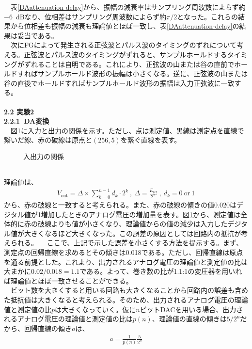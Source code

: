 \documentclass[a4paper,10.5pt]{ltjsarticle}
\begin{document}
　表\ref{DAattenuation-delay}から、振幅の減衰率はサンプリング周波数によらず約$-6$\ dBなり、位相差はサンプリング周波数によらず約$\pi/2$となった。これらの結果から位相差も振幅の減衰も理論値とほぼ一致し、表\ref{DAattenuation-delay}の結果は妥当である。\\
　次にFGによって発生される正弦波とパルス波のタイミングのずれについて考える。正弦波とパルス波のタイミングがずれると、サンプルホールドするタイミングがずれることは自明である。これにより、正弦波の山または谷の直前でホールドすればサンプルホールド波形の振幅は小さくなる。逆に、正弦波の山または谷の直後でホールドすればサンプルホールド波形の振幅は入力正弦波に一致する。\\
\\
{\large \bfseries 2.2 実験2}\\
{\large \bfseries 2.2.1\ DA変換}\\
　図\ref{DA}に入力と出力の関係を示す。ただし、点は測定値、黒線は測定点を直線で繋いだ線、赤の破線は原点と$(256,5)$を繋ぐ直線を表す。\\
\begin{figure}[h]
  \centering
  
  \vspace{-30pt}\caption{入出力の関係}
  \label{DA}
\end{figure}\\
理論値は、
\begin{align}
  V_\mathrm{out}=\Delta\times\sum^{n-1}_{k=0}{d_k\cdot 2^k}\ ,\ \Delta=\frac{E_\mathrm{ref}}{2^n}\ ,\ d_k=0\ \mathrm{or}\ 1
\end{align}
から、赤の破線と一致すると考えられる。また、赤の破線の傾きの値$0.020$はデジタル値が1増加したときのアナログ電圧の増加量を表す。図\ref{DA}から、測定値は全体的に赤の破線よりも値が小さくなり、理論値からの値の減少は入力したデジタル値が大きくなるほど大きくなった。この誤差の原因としては回路内の抵抗が考えられる。
　ここで、上記で示した誤差を小さくする方法を提示する。まず、測定点の回帰直線を求めるとその傾きは0.018である。ただし、回帰直線は原点を通る前提とした。これより、出力されるアナログ電圧の理論値と測定値の比は大まかに$0.02/0.018=1.1$である。よって、巻き数の比が1.1:1の変圧器を用いれば理論値とほぼ一致させることができる。\\
　ビット数を大きくすると用いる回路も大きくなることから回路内の誤差も含めた抵抗値は大きくなると考えられる。そのため、出力されるアナログ電圧の理論値と測定値の比$p$は大きくなっていく。仮に$n$ビットDACを用いる場合、出力されるアナログ電圧の理論値と測定値の比は$p(n)$、理論値の直線の傾きは$5/2^n$だから、回帰直線の傾き$a$は、
\begin{align}
  a=\frac{1}{p(n)}\frac{5}{2^n}
\end{align}
\end{document}
